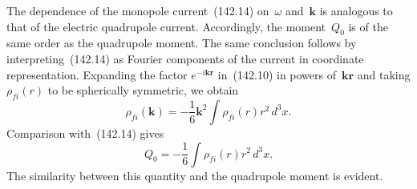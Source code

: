 The dependence of the monopole current~(142.14) on~$\omega$ and~$\mathbf k$ is analogous to that of the electric quadrupole current. Accordingly, the moment~$Q_0$ is of the same order as the quadrupole moment. The same conclusion follows by interpreting~(142.14) as Fourier components of the current in coordinate representation. Expanding the factor $e^{-i\mathbf k\mathbf r}$ in~(142.10) in powers of~$\mathbf k\mathbf r$ and taking $\rho_{fi}(r)$ to be spherically symmetric, we obtain
\[
\rho_{fi}(\mathbf k)=-\frac16\mathbf k^2\int\rho_{fi}(r)r^2\,d^3x.
\]
Comparison with~(142.14) gives
\begin{equation}
Q_0=-\frac16\int\rho_{fi}(r)r^2\,d^3x.
\tag{142.15}
\end{equation}
The similarity between this quantity and the quadrupole moment is evident.

\ProblemHeading

